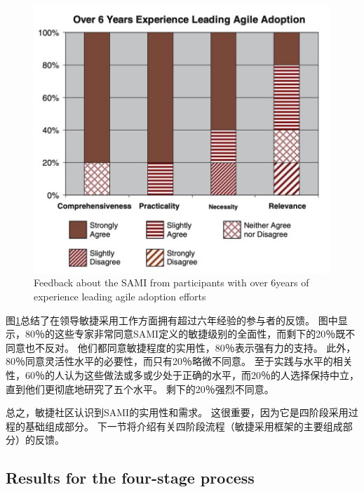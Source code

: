 \documentclass[twocolumn]{svjour3}[]
\begin{document}
\begin{figure} [htb]
    \centering
    \includegraphics[width=1.0\linewidth]{img/fig6.jpg}
    \caption{Feedback about the SAMI from participants with over 6years of experience leading agile adoption efforts}
    \label{fig.6}
\end{figure}

图\ref{fig.6}总结了在领导敏捷采用工作方面拥有超过六年经验的参与者的反馈。 图中显示，80％的这些专家非常同意SAMI定义的敏捷级别的全面性，而剩下的20％既不同意也不反对。 他们都同意敏捷程度的实用性，80％表示强有力的支持。 此外，80％同意灵活性水平的必要性，而只有20％略微不同意。 至于实践与水平的相关性，60％的人认为这些做法或多或少处于正确的水平，而20％的人选择保持中立，直到他们更彻底地研究了五个水平。 剩下的20％强烈不同意。

总之，敏捷社区认识到SAMI的实用性和需求。 这很重要，因为它是四阶段采用过程的基础组成部分。 下一节将介绍有关四阶段流程（敏捷采用框架的主要组成部分）的反馈。

\subsection{Results for the four-stage process}
\end{document}
